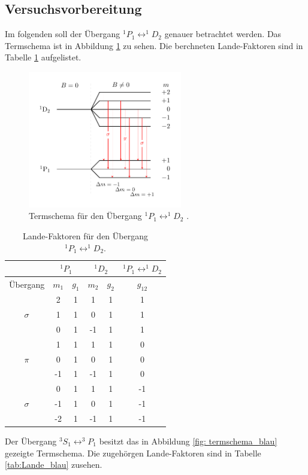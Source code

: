 \subsection{Versuchsvorbereitung}

Im folgenden soll der Übergang  $^1P_1\leftrightarrow ^1\!\!D_2$ genauer betrachtet werden.
Das Termschema ist in Abbildung \ref{fig: termschema_rot} zu sehen. Die berchneten Lande-Faktoren
sind in Tabelle \ref{tab:Lande_rot} aufgelistet.

\FloatBarrier
\begin{figure}[h]
  \centering
  \includegraphics[width=0.6\textwidth]{pics/termschema_rot.pdf}
  \caption{Termschema für den Übergang $^1P_1\leftrightarrow ^1\!\!D_2$ \cite{luckyjosh}.}
  \label{fig: termschema_rot}
\end{figure}
\FloatBarrier
\FloatBarrier
\begin{table}
	\centering
  \caption{Lande-Faktoren für den Übergang $^1P_1\leftrightarrow ^1\!\!D_2$.}
	\label{tab:Lande_rot}
	\begin{tabular}{cccccc}
		\toprule
		{} & \multicolumn{2}{c}{${}^1P_1$}  & \multicolumn{2}{c}{${}^1D_2$}  & $^1P_1\leftrightarrow ^1\!\!D_2$ \\
		\midrule
		 Übergang &   $m_1$  & $g_{1}$ & $m_2$ & $ g_2$  & $g_{12}$  \\
		\midrule
		& 2 & 1 & 1 & 1 & 1\\
		$\sigma$& 1 & 1 & 0 & 1 & 1\\
		& 0 & 1 & -1 & 1 & 1\\
		\midrule
		& 1 & 1 & 1 & 1 & 0\\
		$\pi$ & 0 & 1 & 0 & 1 & 0\\
		& -1 & 1 & -1 & 1 & 0\\
		\midrule
		& 0 & 1 & 1 & 1 & -1\\
		$\sigma$ & -1 & 1 & 0 & 1 & -1\\
		& -2 & 1 & -1 & 1 & -1\\\bottomrule
	\end{tabular}

\end{table}
\FloatBarrier
Der Übergang $^3S_1\leftrightarrow ^3\!\!P_1$ besitzt das in Abbildung \ref{fig: termschema_blau} gezeigte
Termschema. Die zugehörgen Lande-Faktoren sind in Tabelle \ref{tab:Lande_blau} zusehen.


